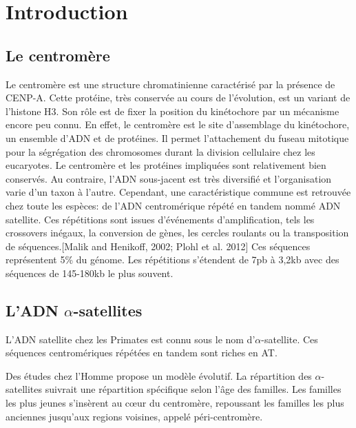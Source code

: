 \documentclass[12pt,a4paper]{article}
\begin{document}

\newpage
\tableofcontents
\setcounter{page}{0}
\thispagestyle{empty}
\newpage 

\section{Introduction}
\subsection{Le centromère}
Le centromère est une structure chromatinienne caractérisé par la présence de CENP-A. Cette protéine, très conservée au cours de l'évolution, est un variant de l'histone H3. Son rôle est de fixer la position du kinétochore par un mécanisme encore peu connu. En effet, le centromère est le site d'assemblage du kinétochore, un ensemble d'ADN et de protéines. Il permet l'attachement du fuseau mitotique pour la ségrégation des chromosomes durant la division cellulaire chez les eucaryotes. Le centromère et les protéines impliquées sont relativement bien conservés. Au contraire, l'ADN sous-jacent est très diversifié et l'organisation varie d'un taxon à l'autre. Cependant, une caractéristique commune est retrouvée chez toute les espèces: de l'ADN centromérique répété en tandem nommé ADN satellite. Ces répétitions sont issues d'événements d'amplification, tels les crossovers inégaux, la conversion de gènes, les cercles roulants ou la transposition de séquences.[Malik and Henikoff, 2002; Plohl et al. 2012]
Ces séquences représentent 5\% du génome. Les répétitions s'étendent de 7pb à 3,2kb avec des séquences de 145-180kb le plus souvent.  

\subsection{L'ADN $\alpha$-satellites}
L'ADN satellite chez les Primates est connu sous le nom d'$\alpha$-satellite. Ces séquences centromériques répétées en tandem sont riches en AT. 

Des études chez l'Homme propose un modèle évolutif. La répartition des $\alpha$-satellites suivrait une répartition spécifique selon l'âge des familles. Les familles les plus jeunes s'insèrent au cœur du centromère, repoussant les familles les plus anciennes jusqu'aux regions voisines, appelé péri-centromère.\\
\end{document}
